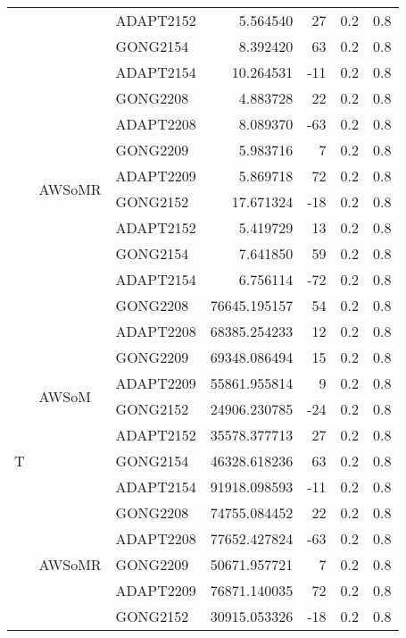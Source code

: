 \begin{tabular}{lllrrrr}
  &        & ADAPT2152 &      5.564540 &     27 &   0.2 &   0.8 \\
  &        & GONG2154 &      8.392420 &     63 &   0.2 &   0.8 \\
  &        & ADAPT2154 &     10.264531 &    -11 &   0.2 &   0.8 \\
\cline{2-7}
  & \multirow{8}{*}{AWSoMR} & GONG2208 &      4.883728 &     22 &   0.2 &   0.8 \\
  &        & ADAPT2208 &      8.089370 &    -63 &   0.2 &   0.8 \\
  &        & GONG2209 &      5.983716 &      7 &   0.2 &   0.8 \\
  &        & ADAPT2209 &      5.869718 &     72 &   0.2 &   0.8 \\
  &        & GONG2152 &     17.671324 &    -18 &   0.2 &   0.8 \\
  &        & ADAPT2152 &      5.419729 &     13 &   0.2 &   0.8 \\
  &        & GONG2154 &      7.641850 &     59 &   0.2 &   0.8 \\
  &        & ADAPT2154 &      6.756114 &    -72 &   0.2 &   0.8 \\
\cline{1-7}
\cline{2-7}
\multirow{16}{*}{T} & \multirow{8}{*}{AWSoM} & GONG2208 &  76645.195157 &     54 &   0.2 &   0.8 \\
  &        & ADAPT2208 &  68385.254233 &     12 &   0.2 &   0.8 \\
  &        & GONG2209 &  69348.086494 &     15 &   0.2 &   0.8 \\
  &        & ADAPT2209 &  55861.955814 &      9 &   0.2 &   0.8 \\
  &        & GONG2152 &  24906.230785 &    -24 &   0.2 &   0.8 \\
  &        & ADAPT2152 &  35578.377713 &     27 &   0.2 &   0.8 \\
  &        & GONG2154 &  46328.618236 &     63 &   0.2 &   0.8 \\
  &        & ADAPT2154 &  91918.098593 &    -11 &   0.2 &   0.8 \\
\cline{2-7}
  & \multirow{8}{*}{AWSoMR} & GONG2208 &  74755.084452 &     22 &   0.2 &   0.8 \\
  &        & ADAPT2208 &  77652.427824 &    -63 &   0.2 &   0.8 \\
  &        & GONG2209 &  50671.957721 &      7 &   0.2 &   0.8 \\
  &        & ADAPT2209 &  76871.140035 &     72 &   0.2 &   0.8 \\
  &        & GONG2152 &  30915.053326 &    -18 &   0.2 &   0.8 \\

\end{tabular}
